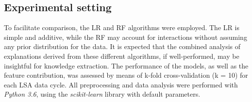 \subsection{Experimental setting}

To facilitate comparison, the \gls{LR} and \gls{RF} algorithms were employed. The \gls{LR} is simple and additive, while the \gls{RF} may account for interactions without assuming any prior distribution for the data. It is expected that the combined analysis of explanations derived from these different algorithms, if well-performed, may be insightful for knowledge extraction. The performance of the models, as well as the feature contribution, was assessed by means of k-fold cross-validation (k = 10) for each \gls{LSA} data cycle. All preprocessing and data analysis were performed with \textit{Python 3.6}, using the \textit{scikit-learn} library with default parameters. 

